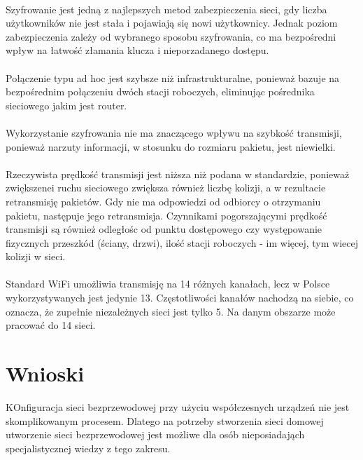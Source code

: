 \documentclass[wide,a4paper,titlepage,12pt] {article}
\begin{document}
 \paragraph{} %
 \label{par:}
 Szyfrowanie jest jedną z najlepszych metod zabezpieczenia sieci, gdy liczba użytkowników nie jest stała i pojawiają się nowi użytkownicy. Jednak poziom zabezpieczenia zależy od wybranego sposobu szyfrowania, co ma bezpośredni wpływ na łatwość złamania klucza i nieporzadanego dostępu.

\paragraph{} %
\label{par:}
Połączenie typu ad hoc jest szybsze niż infrastrukturalne, ponieważ bazuje na bezpośrednim połączeniu dwóch stacji roboczych, eliminując pośrednika sieciowego jakim jest router.

\paragraph{} %
\label{par:}
Wykorzystanie szyfrowania nie ma znaczącego wpływu na szybkość transmisji, ponieważ narzuty informacji, w stosunku do rozmiaru pakietu, jest niewielki.
\paragraph{} %
\label{par:}
Rzeczywista prędkość transmisji jest niższa niż podana w standardzie, ponieważ zwiększenei ruchu sieciowego zwiększa również liczbę kolizji, a w rezultacie retransmisję pakietów. Gdy nie ma odpowiedzi od odbiorcy o otrzymaniu pakietu, następuje jego retransmisja. Czynnikami pogorszającymi prędkość transmisji są również odległośc od punktu dostępowego czy występowanie fizycznych przeszkód (ściany, drzwi), ilość stacji roboczych - im więcej, tym wiecej kolizji w sieci.

\paragraph{} %
\label{par:}
Standard WiFi umożliwia transmisję na 14 różnych kanałach, lecz w Polsce wykorzystywanych jest jedynie 13. Częstotliwości kanałów nachodzą na siebie, co oznacza, że zupełnie niezależnych sieci jest tylko 5. Na danym obszarze może pracować do 14 sieci.

\section{Wnioski} %
\label{sec:wnioski}
KOnfiguracja sieci bezprzewodowej przy użyciu współczesnych urządzeń nie jest skomplikowanym procesem. Dlatego na potrzeby stworzenia sieci domowej utworzenie sieci bezprzewodowej jest możliwe dla osób nieposiadająch specjalistycznej wiedzy z tego zakresu.
\end{document}
